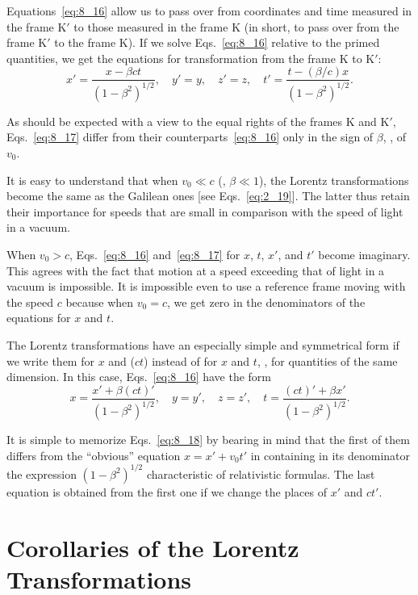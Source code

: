 Equations~\eqref{eq:8_16} allow us to pass over from coordinates and time measured in the frame K$'$ to those measured in the frame K (in short, to pass over from the frame K$'$ to the frame K). If we solve Eqs.~\eqref{eq:8_16} relative to the primed quantities, we get the equations for transformation from the frame K to K$'$:
\begin{equation}\label{eq:8_17}
	x' = \frac{x - \beta ct}{\left(1 - \beta^2\right)^{1/2}},\quad y' = y,\quad z' = z,\quad t' = \frac{t - (\beta/c) x}{\left(1 - \beta^2\right)^{1/2}}.
\end{equation}

As should be expected with a view to the equal rights of the frames K and K$'$, Eqs.~\eqref{eq:8_17} differ from their counterparts~\eqref{eq:8_16} only in the sign of $\beta$, \ie, of $v_0$.

It is easy to understand that when $v_0\ll c$ (\ie, $\beta\ll 1$), the Lorentz transformations become the same as the Galilean ones [see Eqs.~\eqref{eq:2_19}]. The latter thus retain their importance for speeds that are small in comparison with the speed of light in a vacuum.

When $v_0>c$, Eqs.~\eqref{eq:8_16} and~\eqref{eq:8_17} for $x$, $t$, $x'$, and $t'$ become imaginary. This agrees with the fact that motion at a speed exceeding that of light in a vacuum is impossible. It is impossible even to use a reference frame moving with the speed $c$ because when $v_0=c$, we get zero in the denominators of the equations for $x$ and $t$.

The Lorentz transformations have an especially simple and symmetrical form if we write them for $x$ and ($ct$) instead of for $x$ and $t$, \ie, for quantities of the same dimension. In this case, Eqs.~\eqref{eq:8_16} have the form
\begin{equation}\label{eq:8_18}
	x = \frac{x' + \beta (ct)'}{\left(1 - \beta^2\right)^{1/2}},\quad y = y',\quad z = z',\quad t = \frac{(ct)' + \beta x'}{\left(1 - \beta^2\right)^{1/2}}.
\end{equation}

It is simple to memorize Eqs.~\eqref{eq:8_18} by bearing in mind that the first of them differs from the ``obvious'' equation $x=x'+v_0t'$ in containing in its denominator the expression $\left(1 - \beta^2\right)^{1/2}$ characteristic of relativistic formulas. The last equation is obtained from the first one if we change the places of $x'$ and $ct'$.

\section{Corollaries of the Lorentz Transformations}\label{sec:8_3}

